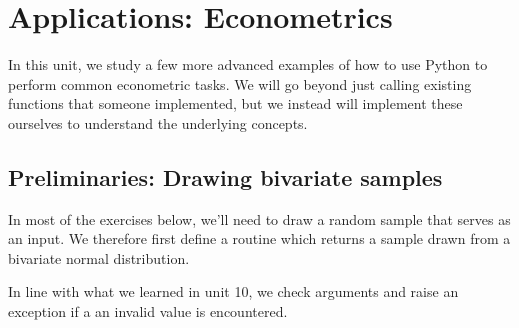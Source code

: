 \documentclass[10pt]{scrartcl}
\begin{document}
    
    \maketitle
    \tableofcontents

    

    
    \hypertarget{applications-econometrics}{%
\section{Applications: Econometrics}\label{applications-econometrics}}

In this unit, we study a few more advanced examples of how to use Python
to perform common econometric tasks. We will go beyond just calling
existing functions that someone implemented, but we instead will
implement these ourselves to understand the underlying concepts.

    \hypertarget{preliminaries-drawing-bivariate-samples}{%
\subsection{Preliminaries: Drawing bivariate
samples}\label{preliminaries-drawing-bivariate-samples}}

In most of the exercises below, we'll need to draw a random sample that
serves as an input. We therefore first define a routine which returns a
sample drawn from a bivariate normal distribution.

In line with what we learned in unit 10, we check arguments and raise an
exception if a an invalid value is encountered.
\end{document}
